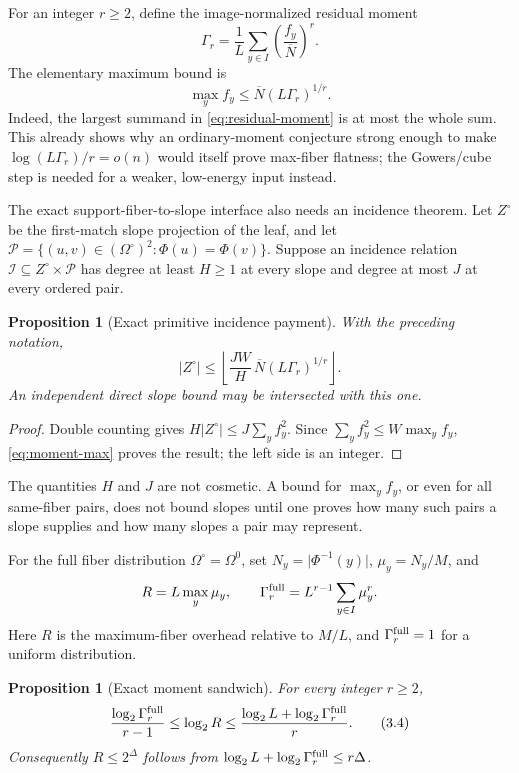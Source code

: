 \documentclass[a4paper,11pt]{amsart}
\newtheorem{proposition}[theorem]{Proposition}
\theoremstyle{remark}
\newcommand{\Om}{\Omega}
\newcommand{\barN}{\overline N}
\newcommand{\abs}[1]{\lvert#1\rvert}
\newcommand{\floor}[1]{\left\lfloor#1\right\rfloor}
\begin{document}
For an integer \(r\ge2\), define the image-normalized residual moment
\[
 \Gamma_r=\frac1L\sum_{y\in I}\left(\frac{f_y}{\barN}\right)^r.
                                                               \tag{3.1}\label{eq:residual-moment}
\]
The elementary maximum bound is
\[
 \max_y f_y\le \barN(L\Gamma_r)^{1/r}.              \tag{3.2}\label{eq:moment-max}
\]
Indeed, the largest summand in \eqref{eq:residual-moment} is at most the
whole sum.  This already shows why an ordinary-moment conjecture strong enough
to make \(\log(L\Gamma_r)/r=o(n)\) would itself prove max-fiber flatness;
the Gowers/cube step is needed for a weaker, low-energy input instead.

The exact support-fiber-to-slope interface also needs an incidence theorem.
Let \(Z^\circ\) be the first-match slope projection of the leaf, and let
\(\mathcal P=\{(u,v)\in(\Om^\circ)^2:\Phi(u)=\Phi(v)\}\).  Suppose an
incidence relation \(\mathcal I\subseteq Z^\circ\times\mathcal P\) has degree
at least \(H\ge1\) at every slope and degree at most \(J\) at every ordered
pair.

\begin{proposition}[Exact primitive incidence payment]\label{prop:primitive-payment}
With the preceding notation,
\[
 \abs{Z^\circ}
 \le \floor{\frac{JW}{H}\,\barN(L\Gamma_r)^{1/r}}. \tag{3.3}\label{eq:primitive-payment}
\]
An independent direct slope bound may be intersected with this one.
\end{proposition}

\begin{proof}
Double counting gives
\(H\abs{Z^\circ}\le J\sum_y f_y^2\).  Since
\(\sum_yf_y^2\le W\max_yf_y\), \eqref{eq:moment-max} proves the result;
the left side is an integer.
\end{proof}

The quantities \(H\) and \(J\) are not cosmetic.  A bound for
\(\max_yf_y\), or even for all same-fiber pairs, does not bound slopes until
one proves how many such pairs a slope supplies and how many slopes a pair may
represent.

For the full fiber distribution \(\Om^\circ=\Om^0\), set
\(N_y=\abs{\Phi^{-1}(y)}\), \(\mu_y=N_y/M\), and
\[
 R=L\max_y\mu_y,
 \qquad \Gamma_r^{\rm full}=L^{r-1}\sum_{y\in I}\mu_y^r.
\]
Here \(R\) is the maximum-fiber overhead relative to \(M/L\), and
\(\Gamma_r^{\rm full}=1\) for a uniform distribution.

\begin{proposition}[Exact moment sandwich]\label{prop:moment-sandwich}
For every integer \(r\ge2\),
\[
 \frac{\log_2\Gamma_r^{\rm full}}{r-1}
 \le\log_2R
 \le\frac{\log_2L+\log_2\Gamma_r^{\rm full}}r.     \tag{3.4}\label{eq:moment-sandwich}
\]
Consequently \(R\le2^\Delta\) follows from
\(\log_2L+\log_2\Gamma_r^{\rm full}\le r\Delta\).
\end{proposition}
\end{document}
